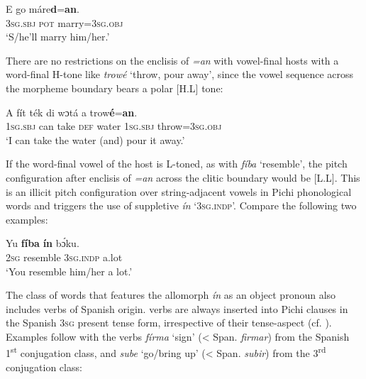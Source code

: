 \ea%
    \label{ex:key:66}
    \gll   E    go  máre\textbf{d}=\textbf{an}.\\
\textsc{3sg.sbj}  \textsc{pot}  marry=\textsc{3sg.obj}\\

\glt ‘S/he’ll marry him/her.’ 
\z

There are no restrictions on the enclisis of \textit{=an} with vowel-final hosts with a word-final H-tone like \textit{trowé} ‘throw, pour away’, since the vowel sequence across the morpheme boundary bears a polar [H.L] tone:


\ea%
    \label{ex:key:67}
    \gll   A    fít  ték    di  wɔtá  a    trow\textbf{é}=\textbf{an}.\\
\textsc{1sg.sbj}  can  take    \textsc{def}  water  \textsc{1sg.sbj}  throw=\textsc{3sg.obj}\\

\glt ‘I can take the water (and) pour it away.’ 
\z

If the word-final vowel of the host is L-toned, as with \textit{fíba} ‘resemble’, the pitch configuration after enclisis of \textit{=an} across the clitic boundary would be [L.L]. This is an illicit pitch configuration over string-adjacent vowels in Pichi phonological words and triggers the use of suppletive \textit{ín} ‘\textsc{3sg.indp’.} Compare the following two examples:


\z


\ea%
    \label{ex:key:69}
    \gll   Yu  \textbf{fíba}      \textbf{ín}    bɔ́ku.\\
\textsc{2sg}  resemble    \textsc{3sg.indp}  a.lot\\

\glt ‘You resemble him/her a lot.’ 
\z

The class of words that features the allomorph \textit{ín} as an object pronoun also includes verbs of Spanish origin.  verbs are always inserted into Pichi clauses in the Spanish \textsc{3sg} present tense form, irrespective of their tense-aspect (cf. ). Examples follow with the verbs \textit{fírma} ‘sign’ (< Span. \textit{firmar}) from the Spanish 1\textsuperscript{st} conjugation class, and \textit{sube} ‘go/bring up’ (< Span. \textit{subir}) from the 3\textsuperscript{rd} conjugation class:


